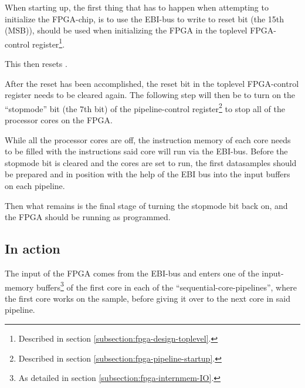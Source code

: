 
When starting up, the first thing that has to happen when attempting to
initialize the FPGA-chip, is to use the EBI-bus to write to reset bit (the 15th
(MSB)), should be used when initializing the FPGA in the toplevel
FPGA-control register\footnote{Described in section
\ref{subsection:fpga-design-toplevel}.}.

This then resets .

After the reset has been accomplished, the reset bit in the toplevel
FPGA-control register needs to be cleared again. The following step will then be
to turn on the ``stopmode'' bit (the 7th bit) of the pipeline-control
register\footnote{Described in section \ref{subsection:fpga-pipeline-startup}.}
to stop all of the processor cores on the FPGA.

While all the processor cores are off, the instruction memory of each core needs
to be filled with the instructions said core will run via the EBI-bus. Before
the stopmode bit is cleared and the cores are set to run, the first datasamples
should be prepared and in position with the help of the EBI bus into the input
buffers on each pipeline.

Then what remains is the final stage of turning the stopmode bit back on, and
the FPGA should be running as programmed.

\subsection{In action}

The input of the FPGA comes from the EBI-bus and enters one of the input-memory
buffers\footnote{As detailed in section \ref{subsection:fpga-internmem-IO}.} of
the first core in each of the ``sequential-core-pipelines'', where the first
core works on the sample, before giving it over to the next core in said
pipeline.
